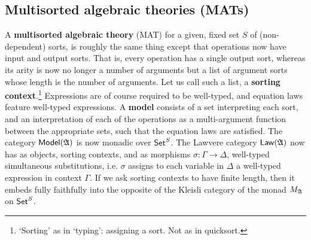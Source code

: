 \documentclass[a4paper]{article}
\begin{document}
\subsection{Multisorted algebraic theories (MATs)}
A \textbf{multisorted algebraic theory} (MAT) for a given, fixed set $S$ of (non-dependent) sorts, is roughly the same thing except that operations now have input and output sorts.
That is, every operation has a single output sort, whereas its arity is now no longer a number of arguments but a list of argument sorts whose length is the number of arguments.
Let us call such a list, a \textbf{sorting context}.\footnote{`Sorting' as in `typing': assigning a sort. Not as in quicksort.}
Expressions are of course required to be well-typed, and equation laws feature well-typed expressions.
A \textbf{model} consists of a set interpreting each sort, and an interpretation of each of the operations as a multi-argument function between the appropriate sets, such that the equation laws are satisfied.
The category ${\mathsf{Model}}({{\mathfrak{A}}})$ is now monadic over ${\mathsf{Set}}^S$.
The Lawvere category $\mathsf{Law}({{\mathfrak{A}}})$ now has as objects, sorting contexts, and as morphisms $\sigma : \Gamma \to \Delta$, well-typed simultaneous substitutions, i.e. $\sigma$ assigns to each variable in $\Delta$ a well-typed expression in context $\Gamma$.
If we ask sorting contexts to have finite length, then it embeds fully faithfully into the opposite of the Kleisli category of the monad $M_{{\mathfrak{A}}}$ on ${\mathsf{Set}}^S$.
\end{document}
